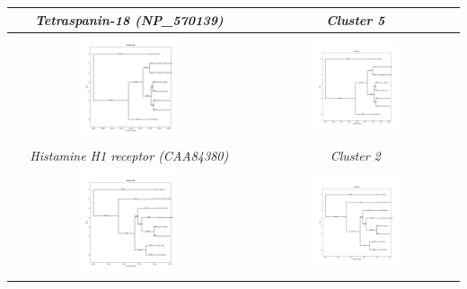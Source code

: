 \documentclass[11pt, a4paper, hidelinks]{article}
\begin{document}
\begin{longtable}{|c|c|}
        \hline
        \textit{Tetraspanin-18 (NP\_570139)} & \textit{Cluster 5} \\
        \hline
        \includegraphics[width=0.45\textwidth]{CAA84380.png} &
        \includegraphics[width=0.45\textwidth]{Cluster 2.png} \\
        \hline
        \textit{Histamine H1 receptor (CAA84380)} & \textit{Cluster 2} \\
        \hline
        \includegraphics[width=0.45\textwidth]{AAB50706.png} &
        \includegraphics[width=0.45\textwidth]{Cluster 3.png} \\

\end{longtable}
\end{document}
